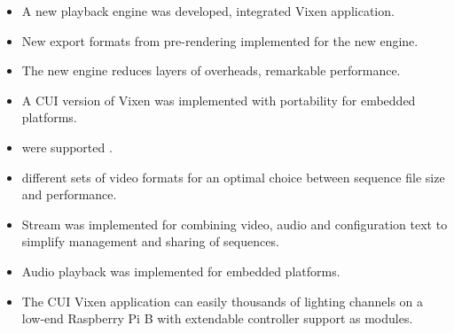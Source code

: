 \begin{itemize}[noitemsep]
  \item A new playback engine was developed, integrated  Vixen application.
  \item New export formats from pre-rendering  implemented for the new engine.
  \item The new engine reduces layers of overheads,  remarkable performance.
  \item A CUI version of Vixen was implemented with portability for embedded platforms.
  \item {} were supported .
  \item {} different sets of video formats for an optimal choice between sequence file size and performance.
  \item Stream  was implemented for combining video, audio and configuration text to simplify management and sharing of sequences.
  \item Audio playback was implemented for embedded platforms.
  \item The CUI Vixen application can easily  thousands of lighting channels on a low-end Raspberry Pi B with extendable controller support as modules.
\end{itemize}
